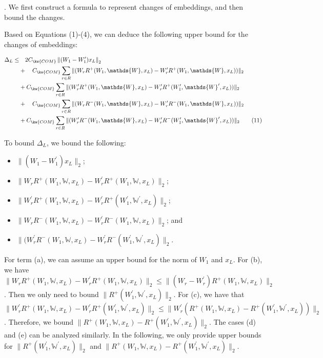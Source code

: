 .
We first construct a formula 
to represent changes of embeddings, and then bound the changes.


Based on Equations (1)-(4), 
we can deduce the following upper bound
for the changes of embeddings:
\begin{small}
\begin{align*}
\Delta_{L}
  \leq& \quad 2C_{\kw{COM}}\left\|(W_{1}-W_{1}^{\prime})x_{L}\right\|_{2} \\
& +\quad C_{\kw{COM}}\sum_{r\in R}\|(W_rR^+(W_{1},\mathds{W},x_{L})-W_r^{\prime}R^+(W_{1},\mathds{W},x_{L}))\|_{2}\\
& + C_{\kw{COM}}\sum_{r\in R}\|(W^{\prime}_rR^+(W_{1},\mathds{W},x_{L})-W_r^{\prime}R^+(W_{1}^{\prime},\mathds{W}^{\prime},x_{L}))\|_{2}\\
& +\quad C_{\kw{COM}}\sum_{r\in R}\|(W_rR^-(W_{1},\mathds{W},x_{L})-W_r^{\prime}R^-(W_{1},\mathds{W},x_{L}))\|_{2}\\
& + C_{\kw{COM}}\sum_{r\in R}\|(W^{\prime}_rR^-(W_{1},\mathds{W},x_{L})-W_r^{\prime}R^-(W_{1}^{\prime},\mathds{W}^{\prime},x_{L}))\|_{2} \tag{11}
\end{align*}
\end{small}

To bound $\Delta_{L}$, 
we bound the following:
\begin{itemize}
\item[(a)] $\|(W_{1}{-}W_{1}^{\prime})x_{L}\|_{2}$;
\item[(b)]  $\|W_rR^+(W_{1},\mathds{W},x_{L}){-}W_r^{\prime}R^+(W_{1},\mathds{W},x_{L})\|_{2}$;
\item[(c)]  $\|W^{\prime}_rR^+(W_{1},\mathds{W},x_{L}){-}W_r^{\prime}R^+(W_{1}^{\prime},\mathds{W}^{\prime},x_{L})\|_{2}$;
\item[(d)]  $\|W_rR^-(W_{1},\mathds{W},x_{L})-W_r^{\prime}R^-(W_{1},\mathds{W},x_{L})\|_{2}$;
and 
\item[(e)]  $\|(W^{\prime}_rR^-(W_{1},\mathds{W},x_{L}){-}W_r^{\prime}R^-(W_{1}^{\prime},\mathds{W}^{\prime},x_{L})\|_{2}$.
\end{itemize}

For term (a), we can assume an upper bound
for the norm of $W_1$ and $x_L$. 
For (b), 
we have 
$\|W_rR^+(W_{1},\mathds{W},x_{L})-W_r^{\prime}R^+(W_{1},\mathds{W},x_{L})\|_{2}
\leq \|(W_r-W_r^{\prime})R^+(W_{1},\mathds{W},x_{L})\|_{2}$.
Then we only need to bound $\|R^+(W_{1}^{\prime},\mathds{W}^{\prime},x_{L})\|_{2}$.
For (c), 
we have that 
$\|W^{\prime}_rR^+(W_{1},\mathds{W},x_{L})-W_r^{\prime}R^+(W_{1}^{\prime},\mathds{W}^{\prime},x_{L})\|_{2}
\leq \|W^{\prime}_r(R^+(W_{1},\mathds{W},x_{L})-R^+(W_{1}^{\prime},\mathds{W}^{\prime},x_{L}))\|_{2}$.
Therefore, we bound 
$\|R^+(W_{1},\mathds{W},x_{L})-R^+(W_{1}^{\prime},\mathds{W}^{\prime},x_{L})\|_{2}$.
The cases (d) and (e) can be analyzed similarly.
In the following, we only provide
upper bounds for $\|R^+(W_{1}^{\prime},\mathds{W}^{\prime},x_{L})\|_{2}$
and $\|R^+(W_{1},\mathds{W},x_{L})-R^+(W_{1}^{\prime},\mathds{W}^{\prime},x_{L})\|_{2}$.

